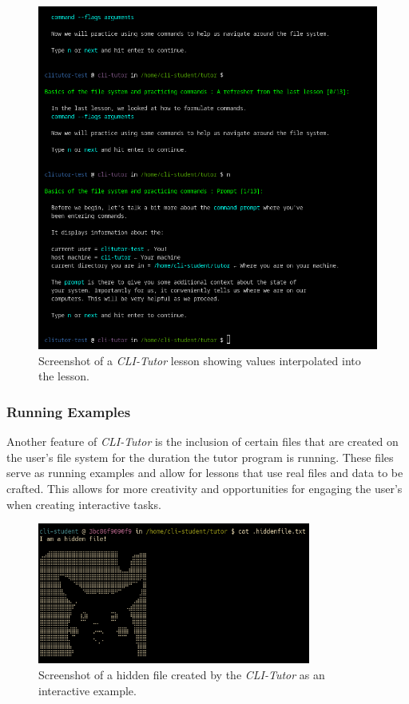 \begin{figure}[htbp]
	\centering
	\includegraphics[width=1\textwidth]{img/cliexpansionfull}
	\caption{Screenshot of a \textit{CLI-Tutor} lesson showing values interpolated into the lesson.}
	\label{fig:templateexpansion}
\end{figure}

\subsubsection{Running Examples}

Another feature of \textit{CLI-Tutor} is the inclusion of certain files that
are created on the user's file system for the duration the tutor program is
running. These files serve as running examples and allow for lessons that use
real files and data to be crafted. This allows for more creativity and
opportunities for engaging the user's when creating interactive tasks.

\begin{figure}[htbp]
	\centering
	\includegraphics[width=0.8\textwidth]{img/hidden}
    \caption{Screenshot of a hidden file created by the \textit{CLI-Tutor} as an interactive example.}
	\label{fig:hidden}
\end{figure}

